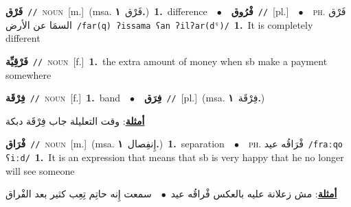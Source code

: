 \documentclass[10pt,a4paper,twoside]{article} %
\begin{document}
\begin{multicols}{2}
{\setlength\topsep{0pt}\textbf{\foreignlanguage{arabic}{فَرْق}}\ {\color{gray}\texttt{//}\color{black}}\ \textsc{noun}\ [m.]\ \color{gray}(msa. \foreignlanguage{arabic}{فَرْق}~\foreignlanguage{arabic}{\textbf{١.}})\color{black}\ \textbf{1.}~difference\ \ $\bullet$\ \ \setlength\topsep{0pt}\textbf{\foreignlanguage{arabic}{فْرُوق}}\ {\color{gray}\texttt{//}\color{black}}\ [pl.]\ \ $\bullet$\ \ \textsc{ph.} \color{gray} \foreignlanguage{arabic}{فَرْق السمَا عن الأرض}\color{black}\ {\color{gray}\texttt{/{\sffamily far(q) ʔissama ʕan ʔilʔar(dˤ)}/}\color{black}}\ \textbf{1.}~It is completely different\ } \vspace{2mm}

{\setlength\topsep{0pt}\textbf{\foreignlanguage{arabic}{فَرْقِيِّة}}\ {\color{gray}\texttt{//}\color{black}}\ \textsc{noun}\ [f.]\ \textbf{1.}~the extra amount of money when sb make a payment somewhere\ } \vspace{2mm}

{\setlength\topsep{0pt}\textbf{\foreignlanguage{arabic}{فِرْقَة}}\ {\color{gray}\texttt{//}\color{black}}\ \textsc{noun}\ [f.]\ \textbf{1.}~band\ \ $\bullet$\ \ \setlength\topsep{0pt}\textbf{\foreignlanguage{arabic}{فِرَق}}\ {\color{gray}\texttt{//}\color{black}}\ [pl.]\ \color{gray}(msa. \foreignlanguage{arabic}{فِرْقَة}~\foreignlanguage{arabic}{\textbf{١.}})\color{black}\  \begin{flushright}\color{gray}\foreignlanguage{arabic}{\textbf{\underline{\foreignlanguage{arabic}{أمثلة}}}: وقت التعليلة جاب فِرْقَة دبكة}\end{flushright}\color{black}} \vspace{2mm}

{\setlength\topsep{0pt}\textbf{\foreignlanguage{arabic}{فْرَاق}}\ {\color{gray}\texttt{//}\color{black}}\ \textsc{noun}\ [m.]\ \color{gray}(msa. \foreignlanguage{arabic}{إِنفِصال}~\foreignlanguage{arabic}{\textbf{١.}})\color{black}\ \textbf{1.}~separation\ \ $\bullet$\ \ \textsc{ph.} \color{gray} \foreignlanguage{arabic}{فْرَاقُه عيد}\color{black}\ {\color{gray}\texttt{/{\sffamily fraːqo ʕiːd}/}\color{black}}\ \textbf{1.}~It is an expression that means that sb is very happy that he no longer will see someone\  \begin{flushright}\color{gray}\foreignlanguage{arabic}{\textbf{\underline{\foreignlanguage{arabic}{أمثلة}}}: مش زعلانة عليه بالعكس فْراقُه عيد\ $\bullet$\ \  سمعت إِنه حاتِم تِعِب كثير بعد الفْراق}\end{flushright}\color{black}} \vspace{2mm}


\end{multicols}
\end{document}
